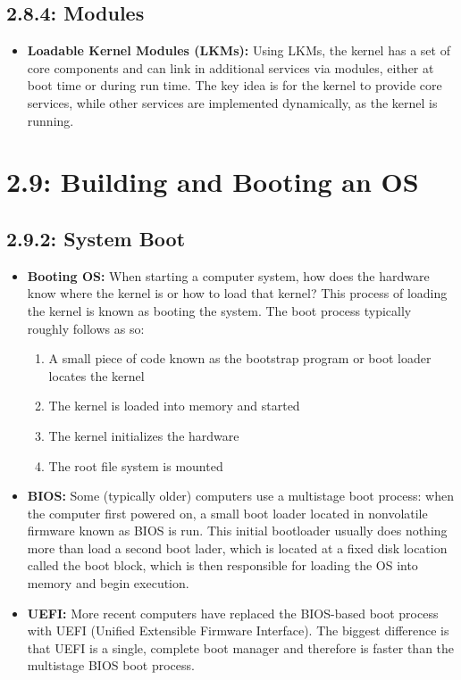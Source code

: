 \documentclass[12pt]{article}
\begin{document}
\subsection*{2.8.4: Modules}

\begin{itemize}
    \item \textbf{Loadable Kernel Modules (LKMs):} Using LKMs, the kernel has a set of core components and can link in additional services via modules, either at boot time or during run time. The key idea is for the kernel to provide core services, while other services are implemented dynamically, as the kernel is running.
\end{itemize}

\section*{2.9: Building and Booting an OS}

\subsection*{2.9.2: System Boot}

\begin{itemize}
    \item \textbf{Booting OS:} When starting a computer system, how does the hardware know where the kernel is or how to load that kernel? This process of loading the kernel is known as booting the system. The boot process typically roughly follows as so:
    \begin{enumerate}
        \item A small piece of code known as the bootstrap program or boot loader locates the kernel
        \item The kernel is loaded into memory and started
        \item The kernel initializes the hardware
        \item The root file system is mounted
    \end{enumerate}
    \item \textbf{BIOS:} Some (typically older) computers use a multistage boot process: when the computer first powered on, a small boot loader located in nonvolatile firmware known as BIOS is run. This initial bootloader usually does nothing more than load a second boot lader, which is located at a fixed disk location called the boot block, which is then responsible for loading the OS into memory and begin execution.
    \item \textbf{UEFI:} More recent computers have replaced the BIOS-based boot process with UEFI (Unified Extensible Firmware Interface). The biggest difference is that UEFI is a single, complete boot manager and therefore is faster than the multistage BIOS boot process.
\end{itemize}
\end{document}
